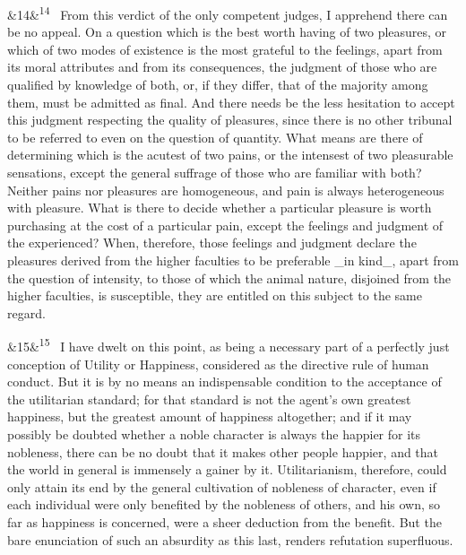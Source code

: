 \documentclass[12pt]{article}
\newcommand{\para}[1][]{\par\noindent\ifx&#1&\else\textsuperscript{\footnotesize #1}~\fi}
\begin{document}
\para[14] From this verdict of the only competent judges, I apprehend there can be no appeal. On a question which is the best worth having of two pleasures, or which of two modes of existence is the most grateful to the feelings, apart from its moral attributes and from its consequences, the judgment of those who are qualified by knowledge of both, or, if they differ, that of the majority among them, must be admitted as final. And there needs be the less hesitation to accept this judgment respecting the quality of pleasures, since there is no other tribunal to be referred to even on the question of quantity. What means are there of determining which is the acutest of two pains, or the intensest of two pleasurable sensations, except the general suffrage of those who are familiar with both? Neither pains nor pleasures are homogeneous, and pain is always heterogeneous with pleasure. What is there to decide whether a particular pleasure is worth purchasing at the cost of a particular pain, except the feelings and judgment of the experienced? When, therefore, those feelings and judgment declare the pleasures derived from the higher faculties to be preferable \_in kind\_, apart from the question of intensity, to those of which the animal nature, disjoined from the higher faculties, is susceptible, they are entitled on this subject to the same regard.

\para[15] I have dwelt on this point, as being a necessary part of a perfectly just conception of Utility or Happiness, considered as the directive rule of human conduct. But it is by no means an indispensable condition to the acceptance of the utilitarian standard; for that standard is not the agent's own greatest happiness, but the greatest amount of happiness altogether; and if it may possibly be doubted whether a noble character is always the happier for its nobleness, there can be no doubt that it makes other people happier, and that the world in general is immensely a gainer by it. Utilitarianism, therefore, could only attain its end by the general cultivation of nobleness of character, even if each individual were only benefited by the nobleness of others, and his own, so far as happiness is concerned, were a sheer deduction from the benefit. But the bare enunciation of such an absurdity as this last, renders refutation superfluous.
\end{document}
